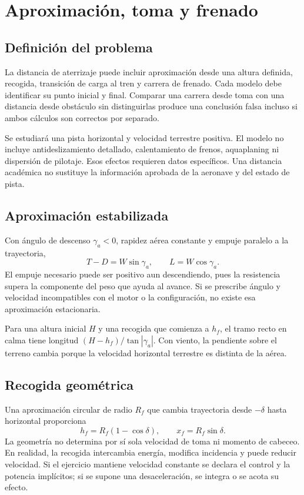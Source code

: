 \chapter{Aproximación, toma y frenado}\label{ch:landing}

\section{Definición del problema}
La distancia de aterrizaje puede incluir aproximación desde una altura definida, recogida, transición de carga al tren y carrera de frenado. Cada modelo debe identificar su punto inicial y final. Comparar una carrera desde toma con una distancia desde obstáculo sin distinguirlas produce una conclusión falsa incluso si ambos cálculos son correctos por separado.

Se estudiará una pista horizontal y velocidad terrestre positiva. El modelo no incluye antideslizamiento detallado, calentamiento de frenos, aquaplaning ni dispersión de pilotaje. Esos efectos requieren datos específicos. Una distancia académica no sustituye la información aprobada de la aeronave y del estado de pista.

\section{Aproximación estabilizada}
Con ángulo de descenso $\gamma_a<0$, rapidez aérea constante y empuje paralelo a la trayectoria,
\begin{equation}
T-D=W\sin\gamma_a,\qquad L=W\cos\gamma_a.
\end{equation}
El empuje necesario puede ser positivo aun descendiendo, pues la resistencia supera la componente del peso que ayuda al avance. Si se prescribe ángulo y velocidad incompatibles con el motor o la configuración, no existe esa aproximación estacionaria.

Para una altura inicial $H$ y una recogida que comienza a $h_f$, el tramo recto en calma tiene longitud $(H-h_f)/\tan|\gamma_a|$. Con viento, la pendiente sobre el terreno cambia porque la velocidad horizontal terrestre es distinta de la aérea.

\section{Recogida geométrica}
Una aproximación circular de radio $R_f$ que cambia trayectoria desde $-\delta$ hasta horizontal proporciona
\begin{equation}
h_f=R_f(1-\cos\delta),\qquad x_f=R_f\sin\delta.
\end{equation}
La geometría no determina por sí sola velocidad de toma ni momento de cabeceo. En realidad, la recogida intercambia energía, modifica incidencia y puede reducir velocidad. Si el ejercicio mantiene velocidad constante se declara el control y la potencia implícitos; si se supone una desaceleración, se integra o se acota su efecto.

